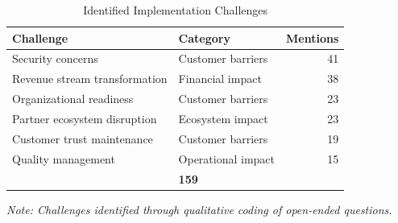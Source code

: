 \begin{table}[!htb]
\renewcommand{\arraystretch}{1.3}
\caption{Identified Implementation Challenges}
\label{tab:implementation-challenges}
\centering
\footnotesize
\begin{tabular}{p{3.7cm}p{2.2cm}r}
\bottomrule
\rowcolor{gray!50}
\textbf{Challenge} & \textbf{Category} & \textbf{Mentions} \\
\hline
Security concerns & Customer barriers & 41 \\
Revenue stream transformation & Financial impact & 38 \\
Organizational readiness & Customer barriers & 23 \\
Partner ecosystem disruption & Ecosystem impact & 23 \\
Customer trust maintenance & Customer barriers & 19 \\
Quality management & Operational impact & 15 \\
\hline
\rowcolor{gray!50}
\multicolumn{2}{r}{\textbf{Total}} & \textbf{159} \\
\toprule
\end{tabular}
\vspace{0.2cm}

\footnotesize\textit{Note: Challenges identified through qualitative coding of open-ended questions.}
\end{table}
